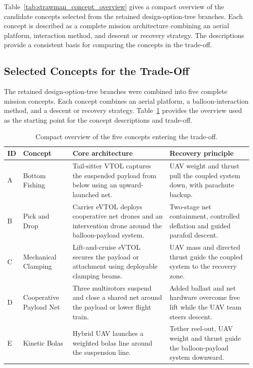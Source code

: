 Table~\ref{tab:strawman_concept_overview} gives a compact overview of the candidate concepts selected from the retained design-option-tree branches. Each concept is described as a complete mission architecture combining an aerial platform, interaction method, and descent or recovery strategy. The descriptions provide a consistent basis for comparing the concepts in the trade-off. 

\subsection{Selected Concepts for the Trade-Off}

The retained design-option-tree branches were combined into five complete mission concepts.
Each concept combines an aerial platform, a balloon-interaction method, and a descent or
recovery strategy. Table~\ref{tab:concept_overview_compact} provides the overview used as
the starting point for the concept descriptions and trade-off.

\begin{table}[H]
    \centering
    \small
    \caption{Compact overview of the five concepts entering the trade-off.}
    \label{tab:concept_overview_compact}
    \begin{tabularx}{\textwidth}{@{}p{} p{} X X@{}}
        \toprule
        \textbf{ID} & \textbf{Concept} & \textbf{Core architecture} & \textbf{Recovery principle} \\
        \midrule
        A & Bottom Fishing 
        & Tail-sitter VTOL captures the suspended payload from below using an upward-launched net. 
        & UAV weight and thrust pull the coupled system down, with parachute backup. \\

        B & Pick and Drop 
        & Carrier eVTOL deploys cooperative net drones and an intervention drone around the balloon-payload system. 
        & Two-stage net containment, controlled deflation and guided parafoil descent. \\

        C & Mechanical Clamping 
        & Lift-and-cruise eVTOL secures the payload or attachment using deployable clamping beams. 
        & UAV mass and directed thrust guide the coupled system to the recovery zone. \\

        D & Cooperative Payload Net 
        & Three multirotors suspend and close a shared net around the payload or lower flight train. 
        & Added ballast and net hardware overcome free lift while the UAV team steers descent. \\

        E & Kinetic Bolas 
        & Hybrid UAV launches a weighted bolas line around the suspension line. 
        & Tether reel-out, UAV weight and thrust guide the balloon-payload system downward. \\
        \bottomrule
    \end{tabularx}
\end{table}









